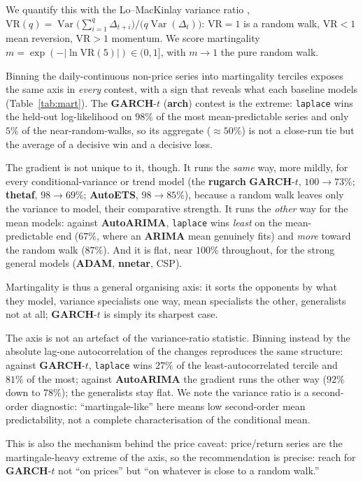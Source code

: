 \documentclass[article]{jss}
\providecommand{\pkg}[1]{\textbf{#1}}
\providecommand{\code}[1]{\texttt{#1}}
\begin{document}
We quantify this with the Lo--MacKinlay variance ratio \citep{lo1988stock},
$\mathrm{VR}(q) = \operatorname{Var}\!\big(\sum_{i=1}^{q}\Delta_{t+i}\big) /
\big(q\operatorname{Var}(\Delta_t)\big)$: $\mathrm{VR}=1$ is a random walk,
$\mathrm{VR}<1$ mean reversion, $\mathrm{VR}>1$ momentum. We score martingality
$m = \exp(-\lvert\ln \mathrm{VR}(5)\rvert) \in (0,1]$, with $m\to 1$ the pure
random walk.

Binning the daily-continuous non-price series into martingality
terciles exposes the same axis in \emph{every} contest, with a sign that reveals
what each baseline models (Table~\ref{tab:mart}). The \pkg{GARCH}-$t$ (\pkg{arch})
contest is the extreme: \code{laplace} wins the held-out log-likelihood on $98\%$
of the most mean-predictable series and only $5\%$ of the near-random-walks, so its
aggregate ($\approx 50\%$) is not a close-run tie but the average of a decisive win
and a decisive loss.

The gradient is not unique to it, though. It runs the
\emph{same} way, more mildly, for every conditional-variance or trend model (the
\pkg{rugarch} \pkg{GARCH}-$t$, $100 \!\to\! 73\%$; \pkg{thetaf}, $98 \!\to\! 69\%$;
\pkg{AutoETS}, $98 \!\to\! 85\%$), because a random walk leaves only the variance
to model, their comparative strength. It runs the \emph{other} way for the mean
models: against \pkg{AutoARIMA}, \code{laplace} wins \emph{least} on the
mean-predictable end ($67\%$, where an \pkg{ARIMA} mean genuinely fits) and
\emph{more} toward the random walk ($87\%$). And it is flat, near $100\%$
throughout, for the strong general models (\pkg{ADAM}, \pkg{nnetar}, CSP).

Martingality is thus a general organising axis: it sorts the opponents by what
they model, variance specialists one way, mean specialists the other, generalists
not at all; \pkg{GARCH}-$t$ is simply its sharpest case.

The axis is not
an artefact of the variance-ratio statistic. Binning instead by the absolute
lag-one autocorrelation of the changes reproduces the same structure: against
\pkg{GARCH}-$t$, \code{laplace} wins $27\%$ of the least-autocorrelated
tercile and $81\%$ of the most; against \pkg{AutoARIMA} the gradient runs the
other way ($92\%$ down to $78\%$); the generalists stay flat. We note the
variance ratio is a second-order diagnostic: ``martingale-like'' here means
low second-order mean predictability, not a complete characterisation of the
conditional mean.

This is also the
mechanism behind the price caveat: price/return series are the martingale-heavy
extreme of the axis, so the recommendation is precise: reach for \pkg{GARCH}-$t$
not ``on prices'' but ``on whatever is close to a random walk.''
\end{document}
